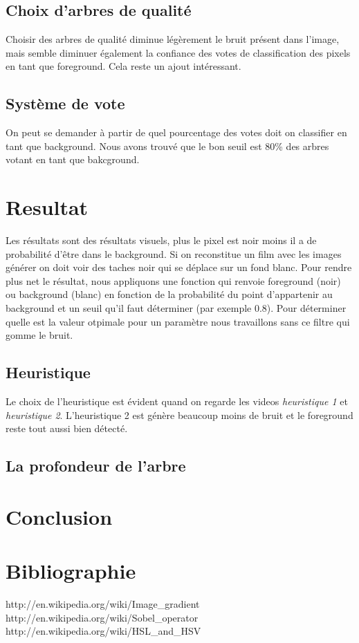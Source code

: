 \documentclass[8pt,a4paper]{article}
\begin{document}
\begin{multicols}{2}
	\subsection{Choix d'arbres de qualité}
	Choisir des arbres de qualité diminue légèrement le bruit présent dans l'image, mais semble diminuer également la confiance des votes
	de classification des pixels en tant que foreground. Cela reste un ajout intéressant. 

	\subsection{Système de vote}
	On peut se demander à partir de quel pourcentage des votes doit on classifier en tant que background. Nous avons trouvé que le bon
	seuil est 80\% des arbres votant en tant que bakcground.

\section{Resultat}

Les résultats sont des résultats visuels, plus le pixel est noir moins il a de probabilité d'être dans le background. Si on reconstitue un film avec les images générer on doit voir des taches noir qui se déplace sur un fond blanc. Pour rendre plus net le résultat, nous appliquons une fonction qui renvoie foreground (noir) ou background (blanc) en fonction de la probabilité du point d'appartenir au background et un seuil qu'il faut déterminer (par exemple 0.8). Pour déterminer quelle est la valeur otpimale pour un paramètre nous travaillons sans ce filtre qui gomme le bruit. 

\subsection{Heuristique}
Le choix de l'heuristique est évident quand on regarde les videos \textit{heuristique 1} et \textit{heuristique 2}. L'heuristique 2 est génère beaucoup moins de bruit et le foreground reste tout aussi bien détecté. 

\subsection{La profondeur de l'arbre}

\section{Conclusion}

	
	
\section{Bibliographie}	
\begin{thebibliography}{2}
    http://en.wikipedia.org/wiki/Image\_gradient
    http://en.wikipedia.org/wiki/Sobel\_operator
    http://en.wikipedia.org/wiki/HSL\_and\_HSV  
\end{thebibliography}

\end{multicols}
\end{document}
